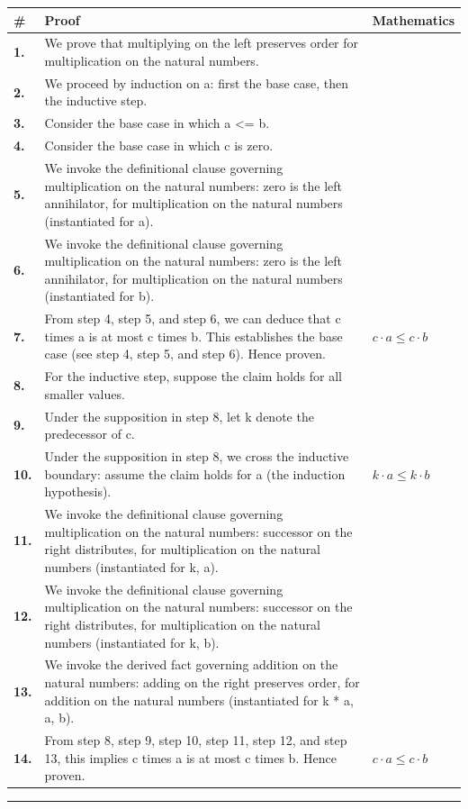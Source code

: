 \documentclass[11pt]{article}
\theoremstyle{definition}
\begin{document}
\begin{tabular}{@{} >{\raggedright\arraybackslash}p{} >{\raggedright\arraybackslash}p{} >{\raggedleft\arraybackslash}p{} @{}}
\textbf{\#} & \textbf{Proof} & \textbf{Mathematics} \\
\midrule
\textbf{1.} & We prove that multiplying on the left preserves order for multiplication on the natural numbers. & \\[0.45em]
\textbf{2.} & We proceed by induction on a: first the base case, then the inductive step. & \\[0.45em]
\textbf{3.} & Consider the base case in which a <= b. & \\[0.45em]
\textbf{4.} & Consider the base case in which c is zero. & \\[0.45em]
\textbf{5.} & We invoke the definitional clause governing multiplication on the natural numbers: zero is the left annihilator, for multiplication on the natural numbers (instantiated for a). & \\[0.45em]
\textbf{6.} & We invoke the definitional clause governing multiplication on the natural numbers: zero is the left annihilator, for multiplication on the natural numbers (instantiated for b). & \\[0.45em]
\textbf{7.} & From step 4, step 5, and step 6, we can deduce that c times a is at most c times b. This establishes the base case (see step 4, step 5, and step 6). Hence proven. & $\displaystyle c \cdot a \le c \cdot b$ \\[0.45em]
\textbf{8.} & For the inductive step, suppose the claim holds for all smaller values. & \\[0.45em]
\textbf{9.} & Under the supposition in step 8, let k denote the predecessor of c. & \\[0.45em]
\textbf{10.} & Under the supposition in step 8, we cross the inductive boundary: assume the claim holds for a (the induction hypothesis). & $\displaystyle k \cdot a \le k \cdot b$ \\[0.45em]
\textbf{11.} & We invoke the definitional clause governing multiplication on the natural numbers: successor on the right distributes, for multiplication on the natural numbers (instantiated for k, a). & \\[0.45em]
\textbf{12.} & We invoke the definitional clause governing multiplication on the natural numbers: successor on the right distributes, for multiplication on the natural numbers (instantiated for k, b). & \\[0.45em]
\textbf{13.} & We invoke the derived fact governing addition on the natural numbers: adding on the right preserves order, for addition on the natural numbers (instantiated for k * a, a, b). & \\[0.45em]
\textbf{14.} & From step 8, step 9, step 10, step 11, step 12, and step 13, this implies c times a is at most c times b. Hence proven. & $\displaystyle c \cdot a \le c \cdot b$ \\[0.45em]
\bottomrule
\end{tabular}
\label{thm:Nat-multiplication-multiplying_on_the_left_preserves_order}
\par\medskip\hrule
\end{document}
